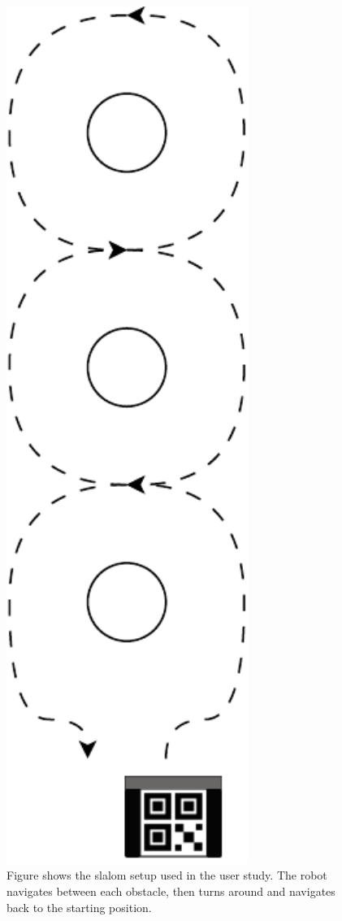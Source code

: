 \documentclass{l4proj}
\begin{document}
\begin{figure}[!ht]
    \centering
    \includegraphics[angle=90,origin=c,width=0.7\textwidth]{images/slalom.pdf}
    \vspace*{-32mm}
    \caption{Figure shows the slalom setup used in the user study. The robot navigates between each obstacle, then turns around and navigates back to the starting position.}
    \label{fig:slalom}
\end{figure}
\end{document}
